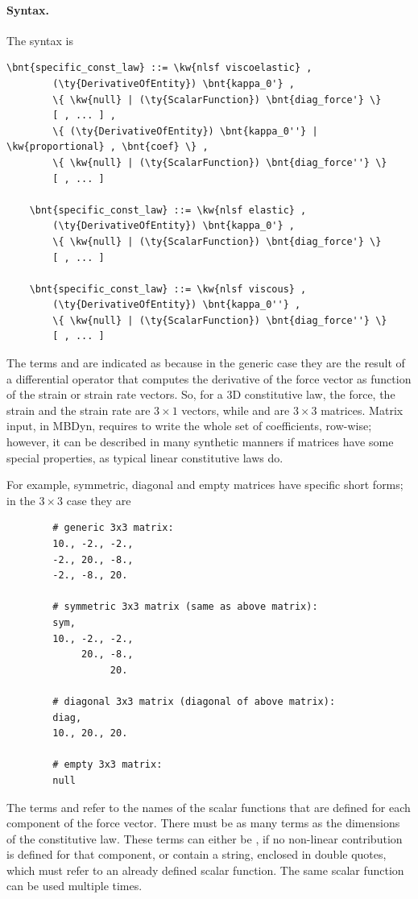 \paragraph{Syntax.}
\label{sec:CL:nlsf-syntax}
The syntax is
\begin{Verbatim}[commandchars=\\\{\}]
    \bnt{specific_const_law} ::= \kw{nlsf viscoelastic} ,
        (\ty{DerivativeOfEntity}) \bnt{kappa_0'} ,
        \{ \kw{null} | (\ty{ScalarFunction}) \bnt{diag_force'} \}
        [ , ... ] ,
        \{ (\ty{DerivativeOfEntity}) \bnt{kappa_0''} | \kw{proportional} , \bnt{coef} \} ,
        \{ \kw{null} | (\ty{ScalarFunction}) \bnt{diag_force''} \}
        [ , ... ]

    \bnt{specific_const_law} ::= \kw{nlsf elastic} ,
        (\ty{DerivativeOfEntity}) \bnt{kappa_0'} ,
        \{ \kw{null} | (\ty{ScalarFunction}) \bnt{diag_force'} \}
        [ , ... ]

    \bnt{specific_const_law} ::= \kw{nlsf viscous} ,
        (\ty{DerivativeOfEntity}) \bnt{kappa_0''} ,
        \{ \kw{null} | (\ty{ScalarFunction}) \bnt{diag_force''} \}
        [ , ... ]
\end{Verbatim}
The terms  and  are indicated as
 because in the generic case they are the result
of a differential operator that computes the derivative of the force vector
as function of the strain or strain rate vectors.
So, for a 3D constitutive law, the force, the strain and the strain rate
are $3\times 1$ vectors, while  and 
are $3\times 3$ matrices.
Matrix input, in MBDyn, requires to write the whole set of coefficients,
row-wise; however, it can be described in many synthetic manners if
matrices have some special properties, as typical linear constitutive laws do.

For example, symmetric, diagonal and empty matrices have specific
short forms; in the $3\times 3$ case they are
\begin{verbatim}
        # generic 3x3 matrix:
        10., -2., -2.,
        -2., 20., -8.,
        -2., -8., 20.

        # symmetric 3x3 matrix (same as above matrix):
        sym,
        10., -2., -2.,
             20., -8.,
                  20.

        # diagonal 3x3 matrix (diagonal of above matrix):
        diag,
        10., 20., 20.

        # empty 3x3 matrix:
        null
\end{verbatim}
The terms  and  refer
to the names of the scalar functions that are defined for each component
of the force vector.
There must be as many terms as the dimensions of the constitutive law.
These terms can either be , if no non-linear contribution
is defined for that component, or contain a string, enclosed in double quotes,
which must refer to an already defined scalar function.
The same scalar function can be used multiple times.


